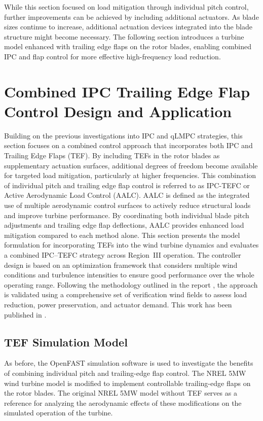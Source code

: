 While this section focused on load mitigation through individual pitch control, further 
improvements can be achieved by including additional actuators. As blade sizes continue to 
increase, additional actuation devices integrated into the blade structure might become 
necessary. The following section introduces a turbine model enhanced 
with trailing edge flaps on the rotor blades, enabling combined IPC and flap control for 
more effective high-frequency load reduction.

\let\oldsectionmark\sectionmark
\renewcommand{\sectionmark}[1]{\oldsectionmark{Combined IPC-TEFC Design and Application}}
\section{Combined IPC Trailing Edge Flap Control Design and Application}
\label{sec:CombinedIPC-TrailingEdgeFlapControl}
\let\sectionmark\oldsectionmark

Building on the previous investigations into IPC and qLMPC strategies, this section focuses on a combined control approach that incorporates both IPC and Trailing Edge Flaps (TEF). By including TEFs in the rotor blades as supplementary actuation surfaces, additional degrees of freedom become available for targeted load mitigation, particularly at higher frequencies. This combination of individual pitch and trailing edge flap control is referred to as IPC-TEFC or Active Aerodynamic Load Control (AALC). AALC is defined as the integrated use of multiple aerodynamic control surfaces to actively reduce structural loads and improve turbine performance. By coordinating both individual blade pitch adjustments and trailing edge flap deflections, AALC provides enhanced load mitigation compared to each method alone. This section presents the model formulation for incorporating TEFs into the wind turbine dynamics and evaluates a combined IPC–TEFC strategy across Region~III operation. The controller design is based on an optimization framework that considers multiple wind conditions and turbulence intensities to ensure good performance over the whole operating range. Following the methodology outlined in the report \cite{osterwinter2019load1}, the approach is validated using a comprehensive set of verification wind fields to assess load reduction, power preservation, and actuator demand. This work has been published in \cite{dittmer2024combined}.


\subsection{TEF Simulation Model} %
As before, the OpenFAST simulation software is used to investigate the benefits of combining individual pitch and trailing-edge flap control. The NREL 5MW wind turbine model is modified to implement controllable trailing-edge flaps on the rotor blades. The original NREL 5MW model without TEF serves as a reference for analyzing the aerodynamic effects of these modifications on the simulated operation of the turbine. 
